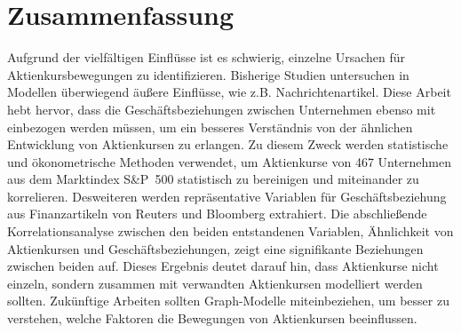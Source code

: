 \section*{Zusammenfassung}

Aufgrund der vielfältigen Einflüsse ist es schwierig, einzelne Ursachen für Aktienkursbewegungen zu identifizieren. Bisherige Studien untersuchen in Modellen überwiegend äußere Einflüsse, wie z.B. Nachrichtenartikel. Diese Arbeit hebt hervor, dass die Geschäftsbeziehungen zwischen Unternehmen ebenso mit einbezogen werden müssen, um ein besseres Verständnis von der ähnlichen Entwicklung von Aktienkursen zu erlangen. Zu diesem Zweck werden statistische und ökonometrische Methoden verwendet, um Aktienkurse von 467 Unternehmen aus dem Marktindex S\&P~500 statistisch zu bereinigen und miteinander zu korrelieren. Desweiteren werden repräsentative Variablen für Geschäftsbeziehung aus Finanzartikeln von Reuters und Bloomberg extrahiert. Die abschließende Korrelationsanalyse zwischen den beiden entstandenen Variablen, Ähnlichkeit von Aktienkursen und Geschäftsbeziehungen, zeigt eine signifikante Beziehungen zwischen beiden auf. Dieses Ergebnis deutet darauf hin, dass Aktienkurse nicht einzeln, sondern zusammen mit verwandten Aktienkursen modelliert werden sollten.
Zukünftige Arbeiten sollten Graph-Modelle miteinbeziehen, um besser zu verstehen, welche Faktoren die Bewegungen von Aktienkursen beeinflussen.








